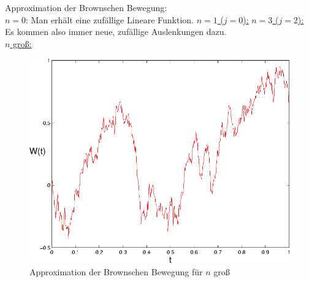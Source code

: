 
Approximation der Brownschen Bewegung:\\
\underline{$n=0$}: Man erhält eine zufällige Lineare Funktion.\nl
\underline{$n=1$ ($j=0$):}\nl
\underline{$n=3$ ($j=2$):}\nl
Es kommen also immer neue, zufällige Auslenkungen dazu.\\
\underline{$n$ groß:}
\begin{figure}[H]
	\begin{center}
		\includegraphics[width=1\textwidth]{./pics/BB.png}
		\caption{Approximation der Brownschen Bewegung für $n$ groß}
		\label{AbbBBngross}
	\end{center}
\end{figure}

